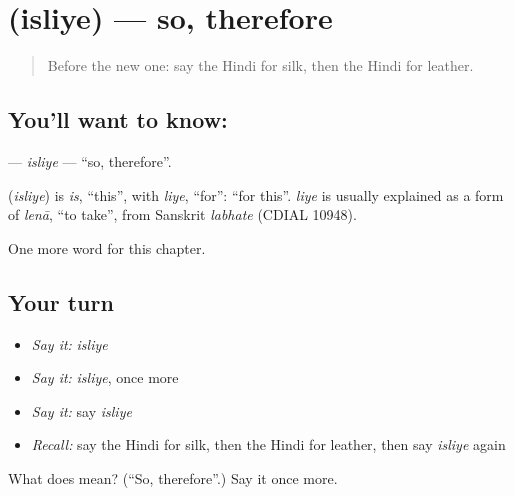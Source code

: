 \section[\texorpdfstring{\hi{इसलिए} (isliye)}{इसलिए (isliye)}]{ (isliye) — so, therefore}

\label{lesson:HI-C247-isliye}



\begin{quote}
Before the new one: say the Hindi for silk, then the Hindi for leather.
\end{quote}

\subsection*{You'll want to know: }
\textbf{} — \emph{isliye} — \textquotedblleft{}so, therefore\textquotedblright{}.

\begin{cousinweb}
\textbf{} (\emph{isliye}) is \emph{is}, \textquotedblleft{}this\textquotedblright{}, with \emph{liye}, \textquotedblleft{}for\textquotedblright{}: \textquotedblleft{}for this\textquotedblright{}. \emph{liye} is usually explained as a form of \emph{lenā}, \textquotedblleft{}to take\textquotedblright{}, from Sanskrit \emph{labhate} (CDIAL 10948).
\end{cousinweb}

\begin{grammarlens}[title={What you've built}]
One more word for this chapter.
\end{grammarlens}

\subsection*{Your turn}
\begin{itemize}
\raggedright
  \item \emph{Say it:} \emph{isliye}
  \item \emph{Say it:} \emph{isliye}, once more
  \item \emph{Say it:} say \emph{isliye}
  \item \emph{Recall:} say the Hindi for silk, then the Hindi for leather, then say \emph{isliye} again
\end{itemize}

\begin{tcolorbox}[breakable,colback=teal!4,colframe=teal!35!black,title={Before you move on}]
What does  mean? (\textquotedblleft{}So, therefore\textquotedblright{}.) Say it once more.
\end{tcolorbox}
